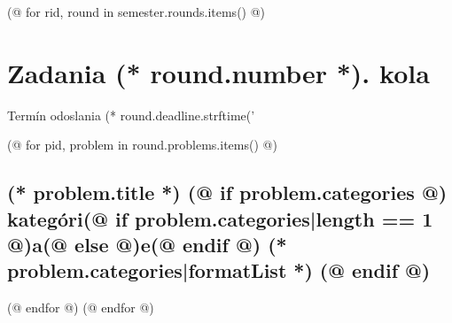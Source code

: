 \documentclass[12pt, twoside]{article}
\newcounter{volume}
\newcounter{semester}
\newcounter{round}
\newcounter{problem}
\begin{document}
    \pagestyle{main-(* competition.id *)}
    \thispagestyle{first-(* competition.id *)-(* volume.id *)-(* semester.id *)}
    \vspace*{15mm}
    
    \newpage
    

    (@ for rid, round in semester.rounds.items() @)%
        \newpage
         
        \pagestyle{problems-(* competition.id *)-(* volume.id *)-(* semester.id *)-(* round.id *)}
        {
            \section{Zadania (* round.number *). kola}%
            \centering%
            \vspace*{-5mm}%
            Termín odoslania (* round.deadline.strftime('%
        } 

        (@ for pid, problem in round.problems.items() @)%
        \setcounter{volume}{(* volume.number *)}%
        \setcounter{semester}{(* semester.number *)}%
        \setcounter{round}{(* round.number *)}%
        \setcounter{problem}{(* problem.number *)}%
        
        \subsection{%
            \texorpdfstring{%
                \large \textbf{(* problem.title *)}%
                (@ if problem.categories @)%
                \normalsize \hfill kategóri(@ if problem.categories|length == 1 @)a(@ else @)e(@ endif @) (* problem.categories|formatList *)%
                (@ endif @)
            }{%
                (* round.number *).(* problem.number *) (* problem.title *)%
            }%
        }%
        (@ endfor @)
    (@ endfor @)
\end{document}
